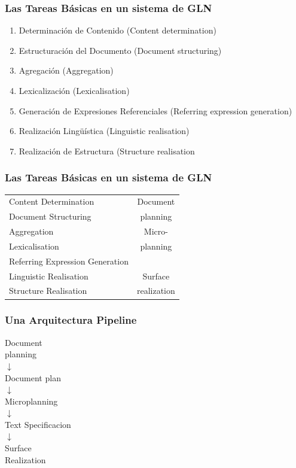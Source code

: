 \documentclass[compress,color=usenames]{beamer}
\begin{document}
\begin{frame}
\frametitle{Las Tareas B\'asicas en un sistema de GLN}

\label{f54}
\begin{enumerate}
\item { { Determinaci\'on de Contenido (Content determination)}}
\item { { Estructuraci\'on del Documento (Document structuring)}}
\item { { Agregaci\'on (Aggregation)}}
\item { { Lexicalizaci\'on (Lexicalisation)}}
\item { { Generaci\'on de Expresiones Referenciales (Referring expression generation)}}
\item { { Realizaci\'on Ling\"u\'istica (Linguistic realisation)}}
\item { { Realizaci\'on de Estructura (Structure realisation}}
\end{enumerate}

\end{frame}

\begin{frame}
\frametitle{Las Tareas B\'asicas en un sistema de GLN}

\begin{center}
\begin{tabular}{|l|c|}  \hline
Content Determination & Document \\
Document Structuring &  planning\\ \hline
Aggregation &  Micro-\\
Lexicalisation & planning\\
Referring Expression Generation & \\ \hline
Linguistic Realisation & Surface\\
Structure Realisation & realization\\ \hline
\end{tabular}
\end{center}

\end{frame}

\begin{frame}
\frametitle{Una Arquitectura Pipeline}

\begin{center}
Document\\
planning\\
$\downarrow$\\
Document plan\\
$\downarrow$\\
Microplanning\\
$\downarrow$\\
Text Specificacion\\
$\downarrow$\\
Surface\\
Realization
\end{center}

\end{frame}
\end{document}
